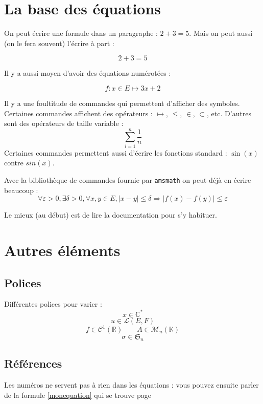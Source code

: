 \documentclass[a4paper, 11pt]{article}
\begin{document}
\section{La base des équations}

On peut écrire une formule dans un paragraphe : $2+3=5$. Mais on peut aussi (on le fera souvent) l'écrire à part :

\[ 2+3 = 5 \]

Il y a aussi moyen d'avoir des équations numérotées :

\begin{equation}
\label{monequation} %
f:x\in E\mapsto 3x + 2
\end{equation}

Il y a une foultitude de commandes qui permettent d'afficher des symboles. Certaines commandes affichent des opérateurs : $\mapsto$, $\leq$, $\in$, $\subset$, etc. D'autres sont des opérateurs de taille variable :
\[
  \sum_{i=1}^n
  {
    \frac{1}{n}
  }
\]
Certaines commandes permettent aussi d'écrire les fonctions standard : $\sin(x)$ contre $sin(x)$.

Avec la bibliothèque de commandes fournie par \texttt{amsmath} on peut déjà en écrire beaucoup :
\[
  \forall\varepsilon>0, \exists\delta>0, \forall x,y\in E, |x-y|\leq\delta \Rightarrow |f(x)-f(y)|\leq\varepsilon
\]

Le mieux (au début) est de lire la documentation pour s'y habituer.

\section{Autres éléments}

  \subsection{Polices}

  Différentes polices pour varier :
  \[ x \in \mathbb{C}^* \]
  \[ u \in \mathcal{L}(E,F) \]
  \[ f \in \mathscr{C}^1(\mathbb{R}) \qquad A \in \mathscr{M}_n(\mathbb{K}) \]
  \[ \sigma \in \mathfrak{S}_n \]

  \subsection{Références}

  Les numéros ne servent pas à rien dans les équations : vous pouvez ensuite parler de la formule \eqref{monequation} qui se trouve page \pageref{monequation}
\end{document}
